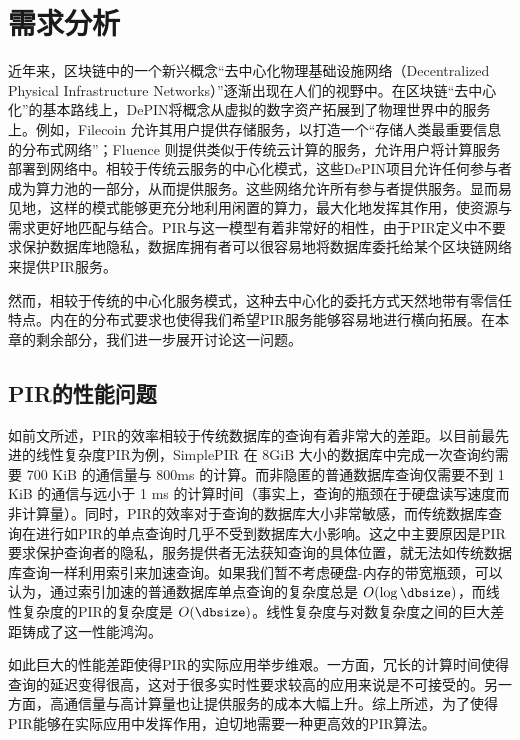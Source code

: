\section{需求分析}

近年来，区块链中的一个新兴概念“去中心化物理基础设施网络（Decentralized Physical Infrastructure Networks）”逐渐出现在人们的视野中。在区块链“去中心化”的基本路线上，DePIN将概念从虚拟的数字资产拓展到了物理世界中的服务上。例如，Filecoin \cite{filecoin} 允许其用户提供存储服务，以打造一个“存储人类最重要信息的分布式网络”；Fluence \cite{fluence} 则提供类似于传统云计算的服务，允许用户将计算服务部署到网络中。相较于传统云服务的中心化模式，这些DePIN项目允许任何参与者成为算力池的一部分，从而提供服务。这些网络允许所有参与者提供服务。显而易见地，这样的模式能够更充分地利用闲置的算力，最大化地发挥其作用，使资源与需求更好地匹配与结合。PIR与这一模型有着非常好的相性，由于PIR定义中不要求保护数据库地隐私，数据库拥有者可以很容易地将数据库委托给某个区块链网络来提供PIR服务。

然而，相较于传统的中心化服务模式，这种去中心化的委托方式天然地带有零信任特点。内在的分布式要求也使得我们希望PIR服务能够容易地进行横向拓展。在本章的剩余部分，我们进一步展开讨论这一问题。
\subsection{PIR的性能问题}
如前文所述，PIR的效率相较于传统数据库的查询有着非常大的差距。以目前最先进的线性复杂度PIR为例，SimplePIR \cite{SimplePIR} 在 8GiB 大小的数据库中完成一次查询约需要 700 KiB 的通信量与 800ms 的计算。而非隐匿的普通数据库查询仅需要不到 1 KiB 的通信与远小于 1 ms 的计算时间（事实上，查询的瓶颈在于硬盘读写速度而非计算量）。同时，PIR的效率对于查询的数据库大小非常敏感，而传统数据库查询在进行如PIR的单点查询时几乎不受到数据库大小影响。这之中主要原因是PIR要求保护查询者的隐私，服务提供者无法获知查询的具体位置，就无法如传统数据库查询一样利用索引来加速查询。如果我们暂不考虑硬盘-内存的带宽瓶颈，可以认为，通过索引加速的普通数据库单点查询的复杂度总是 $O(\log\dbsize)$，而线性复杂度的PIR的复杂度是 $O(\dbsize)$。线性复杂度与对数复杂度之间的巨大差距铸成了这一性能鸿沟。

如此巨大的性能差距使得PIR的实际应用举步维艰。一方面，冗长的计算时间使得查询的延迟变得很高，这对于很多实时性要求较高的应用来说是不可接受的。另一方面，高通信量与高计算量也让提供服务的成本大幅上升。综上所述，为了使得PIR能够在实际应用中发挥作用，迫切地需要一种更高效的PIR算法。

